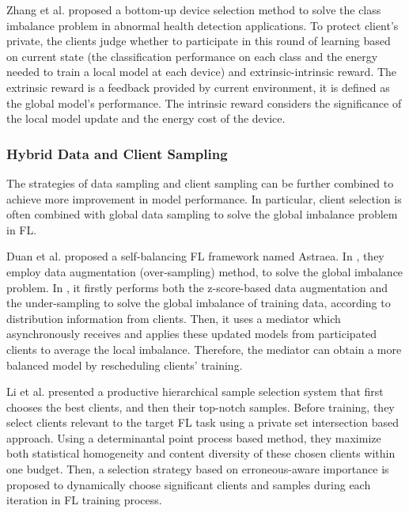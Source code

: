 \documentclass[10pt,journal,compsoc]{IEEEtran}
\begin{document}
Zhang et al. \cite{zhang2021fedsens} proposed a bottom-up device selection method to solve the class imbalance problem in abnormal health detection applications. To protect client's private, the clients judge whether to participate in this round of learning based on current state (the classification performance on each class and the energy needed to train a local model at each device) and extrinsic-intrinsic reward. The extrinsic reward is a feedback provided by current environment, it is defined as the global model's performance. The intrinsic reward considers the significance of the local model update and the energy cost of the device. 
\vspace{-0.3cm}

\subsubsection{Hybrid Data and Client Sampling}
The strategies of data sampling and client sampling can be further combined to achieve more improvement in model performance. In particular, client selection is often combined with global data sampling to solve the global imbalance problem in FL. 

Duan et al. \cite{duan2019astraea}\cite{duan2020self} proposed a self-balancing FL framework named Astraea. In \cite{duan2019astraea}, they employ data augmentation (over-sampling) method, to solve the global imbalance problem. In \cite{duan2020self}, it firstly performs both the z-score-based data augmentation and the under-sampling to solve the global imbalance of training data, according to distribution information from clients. Then, it uses a mediator which asynchronously receives and applies these updated models from participated clients to average the local imbalance. Therefore, the mediator can obtain a more balanced model by rescheduling clients' training. 

Li et al. \cite{li2021sample} presented a productive hierarchical sample selection system that first chooses the best clients, and then their top-notch samples. Before training, they select clients relevant to the target FL task using a private set intersection based approach. Using a determinantal point process based method, they maximize both statistical homogeneity and content diversity of these chosen clients within one budget. Then, a selection strategy based on erroneous-aware importance is proposed to dynamically choose significant clients and samples during each iteration in FL training process. 
\vspace{-0.3cm}
\end{document}
